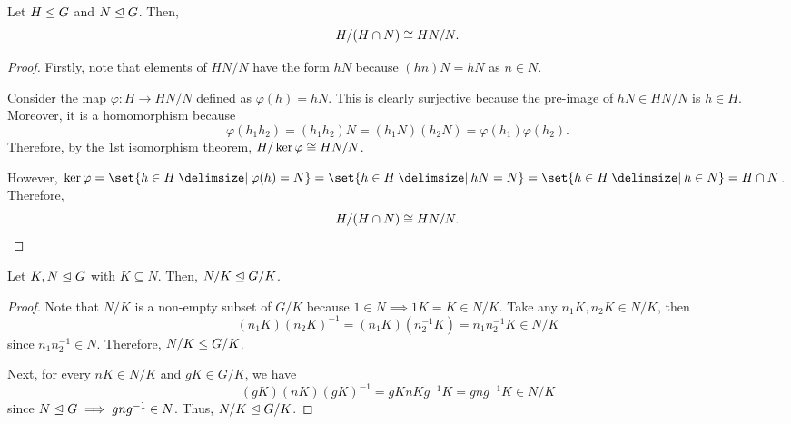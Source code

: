 \documentclass[11pt]{penrose}
\begin{document}
\begin{nthm}
    Let $H \mathrel{\leq} G$ and $N \mathrel{\trianglelefteq} G$. Then,
    \begin{equation*}
        H / (H \cap N) \mathrel{\cong} HN / N.
    \end{equation*}
\end{nthm}
\begin{proof}
    Firstly, note that elements of $HN/N$ have the form $hN$ because $(hn)N = hN$ as $n \in N$.

    Consider the map $\varphi : H \to HN/N$ defined as $\varphi(h) = hN$. This is clearly surjective because the pre-image of $hN \in HN/N$ is $h \in H$. Moreover, it is a homomorphism because
    \begin{equation*}
        \varphi( h_{1} h_{2} )
        = (h_{1} h_{2}) N
        = (h_{1}N) (h_{2}N)
        = \varphi(h_{1}) \varphi(h_{2}).
    \end{equation*}
    Therefore, by the 1st isomorphism theorem, $H / \ker\varphi \mathrel{\cong} HN / N$.

    However, $\ker\varphi = \set{h \in H \st \varphi(h) = N} = \set{h \in H \st hN = N} = \set{h \in H \st h \in N} = H \cap N$. Therefore,
    \begin{equation*}
        H / (H \cap N) \mathrel{\cong} HN / N. \qedhere
    \end{equation*}
\end{proof}

\begin{nlemma}
    Let $K, N \mathrel{\trianglelefteq} G$ with $K \subseteq N$. Then, $N/K \mathrel{\trianglelefteq} G/K$.
\end{nlemma}
\begin{proof}
    Note that $N/K$ is a non-empty subset of $G/K$ because $1 \in N \implies 1K = K \in N/K$. Take any $n_{1}K, n_{2}K \in N/K$, then
    \begin{equation*}
        (n_{1}K) (n_{2}K)^{-1}
        = (n_{1}K) (n_{2}^{-1} K)
        = n_{1} n_{2}^{-1} K
        \in N/K
    \end{equation*}
    since $n_{1} n_{2}^{-1} \in N$. Therefore, $N/K \mathrel{\leq} G/K$.

    Next, for every $nK \in N/K$ and $gK \in G/K$, we have
    \begin{equation*}
        (gK) (nK) (gK)^{-1}
        = gK nK g^{-1}K
        = g n g^{-1 } K
        \in N/K
    \end{equation*}
    since $N \mathrel{\trianglelefteq} G \implies g n g^{-1 } \in N$. Thus, $N/K \mathrel{\trianglelefteq} G/K$.
\end{proof}
\end{document}
